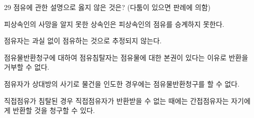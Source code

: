 \begin{question}{29}
점유에 관한 설명으로 옳지 않은 것은? (다툼이 있으면 판례에 의함)
\begin{choices}
  \item 피상속인의 사망을 알지 못한 상속인은 피상속인의 점유를 승계하지 못한다.
  \item 점유자는 과실 없이 점유하는 것으로 추정되지 않는다.
  \item 점유물반환청구에 대하여 점유침탈자는 점유물에 대한 본권이 있다는 이유로 반환을 거부할 수 없다.
  \item 점유자가 상대방의 사기로 물건을 인도한 경우에는 점유물반환청구를 할 수 없다.
  \item 직접점유가 침탈된 경우 직접점유자가 반환받을 수 없는 때에는 간접점유자는 자기에게 반환할 것을 청구할 수 있다.
\end{choices}
\end{question}
